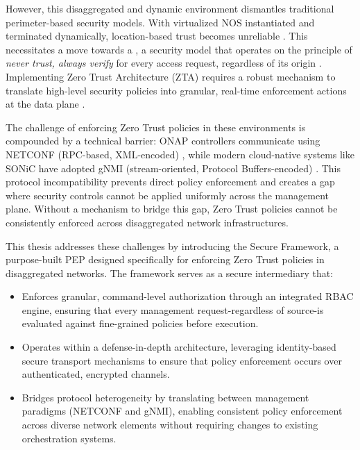 \documentclass[12pt, a4paper, reqno, oneside]{book}
\begin{document}
However, this disaggregated and dynamic environment dismantles traditional perimeter-based security models. With virtualized NOS instantiated and terminated dynamically, location-based trust becomes unreliable \cite{fernando2025addressing}. This necessitates a move towards a , a security model that operates on the principle of \textit{never trust, always verify} for every access request, regardless of its origin \cite{rose_zero_2020}. Implementing Zero Trust Architecture (ZTA) requires a robust mechanism to translate high-level security policies into granular, real-time enforcement actions at the data plane \cite{fernando2025addressing}.


The challenge of enforcing Zero Trust policies in these environments is compounded by a technical barrier: ONAP controllers communicate using NETCONF (RPC-based, XML-encoded) \cite{rfc6241_netconf}, while modern cloud-native systems like SONiC have adopted gNMI (stream-oriented, Protocol Buffers-encoded)  \cite{openconfig_gnmi_2018}. This protocol incompatibility prevents direct policy enforcement and creates a gap where security controls cannot be applied uniformly across the management plane. Without a mechanism to bridge this gap, Zero Trust policies cannot be consistently enforced across disaggregated network infrastructures.

This thesis addresses these challenges by introducing the Secure Framework, a purpose-built PEP designed specifically for enforcing Zero Trust policies in disaggregated networks. The framework serves as a secure intermediary that:
\begin{itemize}
    \item Enforces granular, command-level authorization through an integrated RBAC engine, ensuring that every management request-regardless of source-is evaluated against fine-grained policies before execution.
    
    \item Operates within a defense-in-depth architecture, leveraging identity-based secure transport mechanisms to ensure that policy enforcement occurs over authenticated, encrypted channels.
    
\item Bridges protocol heterogeneity by translating between management paradigms (NETCONF and gNMI), enabling consistent policy enforcement across diverse network elements without requiring changes to existing orchestration systems.
\end{itemize}
\end{document}
